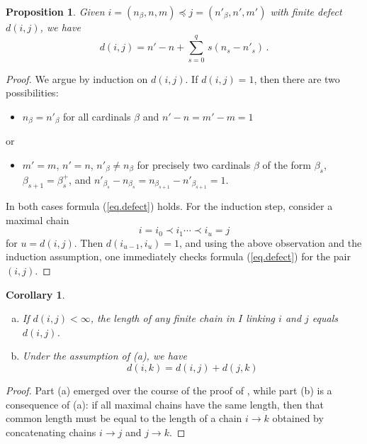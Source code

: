 \documentclass[11pt]{article}
\theoremstyle{plain}
\newtheorem{proposition}[lemma]{Proposition}
\newtheorem{corollary}[lemma]{Corollary}
\theoremstyle{nonumberplain}
\theoremstyle{plain}
\theoremstyle{nonumberplain}
\newtheorem{proof}{Proof}
\begin{document}
\begin{proposition}\label{pr.form}
Given $i=(n_\beta,n,m)\preceq j= (n'_\beta,n',m')$ with
finite defect $d(i,j)$, we have
\begin{equation}
d(i,j)=
n'-n+\sum_{s=0}^q\,s\left(n_s-n'_s\right)\,.
\label{eq.defect}
\end{equation}
\end{proposition}
\begin{proof}
  We argue by induction on $d(i,j)$.  If {$d(i,j)=1$}, then there are two possibilities:
  \begin{itemize}
  \item $n_\beta=n'_\beta$ for all cardinals $\beta$ and
        {$n'-n = m'-m = 1$}
  \end{itemize}
      or
  \begin{itemize}
  \item {$m'=m$, $n'=n$, $n'_{\beta}\neq n_{\beta}$ for precisely two cardinals $\beta$ of the form $\beta_s$, $\beta_{s+1}=\beta_s^+$, and $
        n'_{\beta_s}-n_{\beta_s} = n_{\beta_{s+1}}-n'_{\beta_{s+1}} = 1$.}
  \end{itemize}
    In both cases formula (\ref{eq.defect}) holds.  For the induction step, consider a maximal chain
\begin{equation*}
  i=i_0\prec i_1\cdots\prec i_{u}=j
\end{equation*}
for $u=d(i,j)$.  Then $d\left(i_{u-1},i_u\right)=1$, and using the above observation and the induction assumption, one immediately checks formula (\ref{eq.defect}) for the pair $(i,j)$.
\end{proof}


  
\begin{corollary}\label{cor.defecttriangle}
\begin{enumerate}[(a)]
\item If $d(i,j)<\infty$, the length of any finite chain in $I$ linking $i$ and $j$ equals $d(i,j)$.
\item Under the assumption of (a), we have
  \begin{equation*}
    d(i,k) = d(i,j)+d(j,k)
  \end{equation*}
\end{enumerate}
\end{corollary}
\begin{proof}
  Part (a) emerged over the course of the proof of ,
  while part (b) is a consequence of (a): if all maximal chains have
  the same length, then that common length must be equal to the length
  of a chain $i\to k$ obtained by concatenating chains $i\to j$ and
  $j\to k$.
\end{proof}
\end{document}
